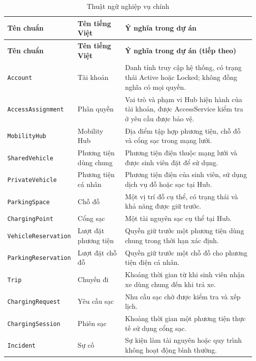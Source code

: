 \begingroup
\small
\begin{longtable}{|L{44mm}|L{34mm}|L{62mm}|}
  \caption{Thuật ngữ nghiệp vụ chính}\label{tab:business-terms}\\
  \hline
  \textbf{Tên chuẩn} & \centering\arraybackslash\textbf{Tên tiếng Việt} & \centering\arraybackslash\textbf{Ý nghĩa trong dự án}\\
  \hline
  \endfirsthead
  \hline
  \textbf{Tên chuẩn} & \centering\arraybackslash\textbf{Tên tiếng Việt} & \centering\arraybackslash\textbf{Ý nghĩa trong dự án (tiếp theo)}\\
  \hline
  \endhead
  \texttt{Account} & Tài khoản & Danh tính truy cập hệ thống, có trạng thái Active hoặc Locked; không đồng nghĩa có mọi quyền.\\
  \hline
  \texttt{AccessAssignment} & Phân quyền & Vai trò và phạm vi Hub hiện hành của tài khoản, được AccessService kiểm tra ở yêu cầu được bảo vệ.\\
  \hline
  \texttt{MobilityHub} & Mobility Hub & Địa điểm tập hợp phương tiện, chỗ đỗ và cổng sạc trong mạng lưới.\\
  \hline
  \texttt{SharedVehicle} & Phương tiện dùng chung & Phương tiện điện thuộc mạng lưới và được sinh viên đặt để sử dụng.\\
  \hline
  \texttt{PrivateVehicle} & Phương tiện cá nhân & Phương tiện điện của sinh viên, sử dụng dịch vụ đỗ hoặc sạc tại Hub.\\
  \hline
  \texttt{ParkingSpace} & Chỗ đỗ & Một vị trí đỗ cụ thể, có trạng thái và khả năng được giữ trước.\\
  \hline
  \texttt{ChargingPoint} & Cổng sạc & Một tài nguyên sạc cụ thể tại Hub.\\
  \hline
  \texttt{VehicleReservation} & Lượt đặt phương tiện & Quyền giữ trước một phương tiện dùng chung trong thời hạn xác định.\\
  \hline
  \texttt{ParkingReservation} & Lượt đặt chỗ đỗ & Quyền giữ trước một chỗ đỗ cho phương tiện điện cá nhân.\\
  \hline
  \texttt{Trip} & Chuyến đi & Khoảng thời gian từ khi sinh viên nhận xe dùng chung đến khi trả xe.\\
  \hline
  \texttt{ChargingRequest} & Yêu cầu sạc & Nhu cầu sạc chờ được kiểm tra và xếp lịch.\\
  \hline
  \texttt{ChargingSession} & Phiên sạc & Khoảng thời gian một phương tiện thực tế sử dụng cổng sạc.\\
  \hline
  \texttt{Incident} & Sự cố & Sự kiện làm tài nguyên hoặc quy trình không hoạt động bình thường.\\

\end{longtable}
